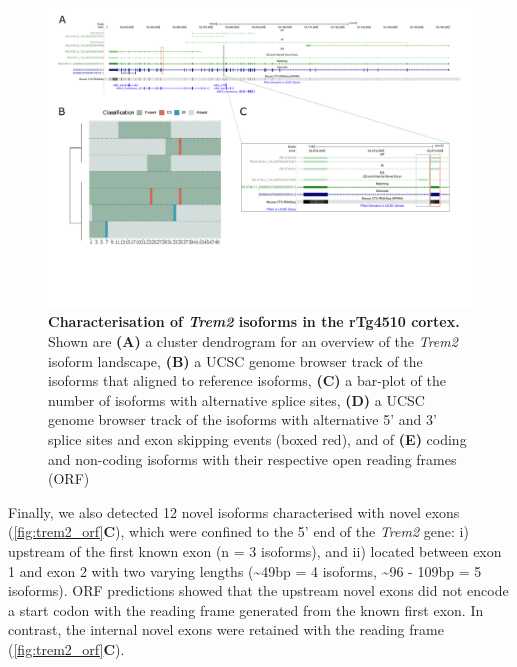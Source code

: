\begin{landscape}
	\begin{figure}[htp]
		\centering
		\captionsetup{width=1.3\textwidth}
		\includegraphics[page=12,trim={0 2cm 0 0},scale = 0.8]{Figures/TargetGenes_Annotation_Landscape.pdf}
		\caption[Characterisation of the \textit{Trem2} isoform landscape]%
		{\textbf{Characterisation of \textit{Trem2} isoforms in the rTg4510 cortex.} Shown are \textbf{(A)} a cluster dendrogram for an overview of the \textit{Trem2} isoform landscape, \textbf{(B)} a UCSC genome browser track of the isoforms that aligned to reference isoforms, \textbf{(C)} a bar-plot of the number of isoforms with alternative splice sites, \textbf{(D)} a UCSC genome browser track of the isoforms with alternative 5' and 3' splice sites and exon skipping events (boxed red), and of \textbf{(E)} coding and non-coding isoforms with their respective open reading frames (ORF) }    
		\label{fig:trem2}
	\end{figure}
\end{landscape}
\restoregeometry 

Finally, we also detected 12 novel isoforms characterised with novel exons (\cref{fig:trem2_orf}\textbf{C}), which were confined to the 5' end of the \textit{Trem2} gene: i)  upstream of the first known exon (n = 3 isoforms), and ii) located between exon 1 and exon 2 with two varying lengths (\textasciitilde49bp = 4 isoforms, \textasciitilde96 - 109bp = 5 isoforms). ORF predictions showed that the upstream novel exons did not encode a start codon with the reading frame generated from the known first exon. In contrast, the internal novel exons were retained with the reading frame (\cref{fig:trem2_orf}\textbf{C}). 

